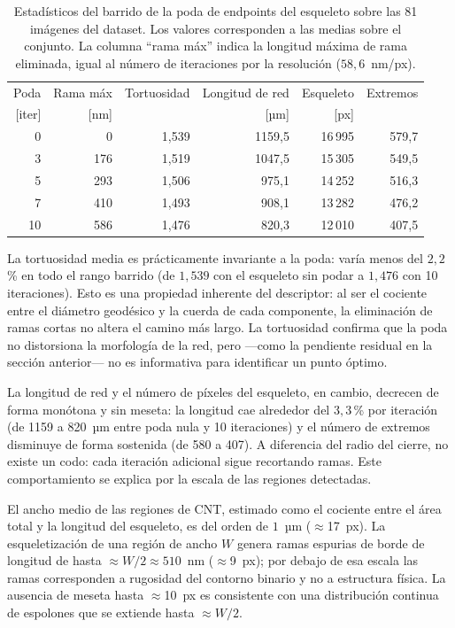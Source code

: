\begin{table}[H]
\centering
\small
\caption{Estadísticos del barrido de la poda de endpoints del esqueleto sobre
las 81 imágenes del dataset. Los valores corresponden a las medias sobre el
conjunto. La columna ``rama máx'' indica la longitud máxima de rama eliminada,
igual al número de iteraciones por la resolución ($58{,}6$~nm/px).}
\label{tab:poda}
\begin{tabular}{rrrrrr}
\hline
Poda     & Rama máx & Tortuosidad & Longitud de red & Esqueleto & Extremos \\
{[iter]} & [nm]     &             & [µm]            & [px]      &          \\
\hline
0  & 0   & 1,539 & 1159,5 & 16\,995 & 579,7 \\
3  & 176 & 1,519 & 1047,5 & 15\,305 & 549,5 \\
5  & 293 & 1,506 &  975,1 & 14\,252 & 516,3 \\
7  & 410 & 1,493 &  908,1 & 13\,282 & 476,2 \\
10 & 586 & 1,476 &  820,3 & 12\,010 & 407,5 \\
\hline
\end{tabular}
\end{table}
 
La tortuosidad media es prácticamente invariante a la poda: varía menos del
$2{,}2$\,\% en todo el rango barrido (de $1{,}539$ con el esqueleto sin podar a
$1{,}476$ con 10 iteraciones). Esto es una propiedad inherente del descriptor:
al ser el cociente entre el diámetro geodésico y la cuerda de cada componente,
la eliminación de ramas cortas no altera el camino más largo. La tortuosidad
confirma que la poda no distorsiona la morfología de la red, pero ---como la
pendiente residual en la sección anterior--- no es informativa para identificar
un punto óptimo.
 
La longitud de red y el número de píxeles del esqueleto, en cambio, decrecen de
forma monótona y sin meseta: la longitud cae alrededor del $3{,}3$\,\% por
iteración (de 1159 a 820~µm entre poda nula y 10 iteraciones) y el número de
extremos disminuye de forma sostenida (de 580 a 407). A diferencia del radio del
cierre, no existe un codo: cada iteración adicional sigue recortando ramas. Este
comportamiento se explica por la escala de las regiones detectadas.
 
El ancho medio de las regiones de CNT, estimado como el cociente entre el área
total y la longitud del esqueleto, es del orden de $1$~µm ($\approx$17~px). La
esqueletización de una región de ancho $W$ genera ramas espurias de borde de
longitud de hasta $\approx W/2 \approx 510$~nm ($\approx$9~px); por debajo de esa
escala las ramas corresponden a rugosidad del contorno binario y no a estructura
física. La ausencia de meseta hasta $\approx$10~px es consistente con una
distribución continua de espolones que se extiende hasta $\approx W/2$.
 
